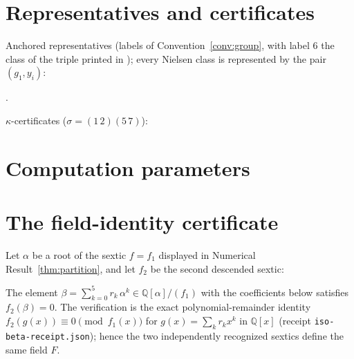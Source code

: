 \documentclass[11pt]{amsart}
\newcommand{\QQ}{\mathbb{Q}}
\newcommand{\kap}{\kappa}
\theoremstyle{plain}
\theoremstyle{definition}
\begin{document}
\appendix

\section{Representatives and certificates}\label{app:reps}

\begin{center}
\small
\GeneratorsTable
\end{center}

\medskip
Anchored representatives (labels of Convention~\ref{conv:group},
with label $6$ the class of the triple printed in
\cite{HJLPPZ}); every Nielsen
class is represented by the pair $(g_1,y_i)$:
\begin{center}
\small
\RepsTable
\end{center}

\medskip
\CGensLine.

\medskip
$\kap$-certificates ($\sigma=(1\,2)(5\,7)$):
\begin{center}
\small
\KappaCertsTable
\end{center}

\section{Computation parameters}\label{app:params}

\begin{center}
\ParamsTable
\end{center}

\section{The field-identity certificate}\label{app:beta}

Let $\alpha$ be a root of the sextic $f=f_1$ displayed in Numerical
Result~\ref{thm:partition}, and let $f_2$ be the second descended
sextic:
\begin{center}\small\SexticTwoTable\end{center}

\medskip
The element $\beta=\sum_{k=0}^{5} r_k\,\alpha^k\in\QQ[\alpha]/(f_1)$
with the coefficients below satisfies $f_2(\beta)=0$. The
verification is the exact polynomial-remainder identity
$f_2(g(x))\equiv 0 \pmod{f_1(x)}$ for $g(x)=\sum_k r_kx^k$ in
$\QQ[x]$ (receipt \texttt{iso-beta-receipt.json}); hence the two
independently recognized sextics define the same field $F$.
\begin{center}\small\IsoBetaTable\end{center}
\end{document}
